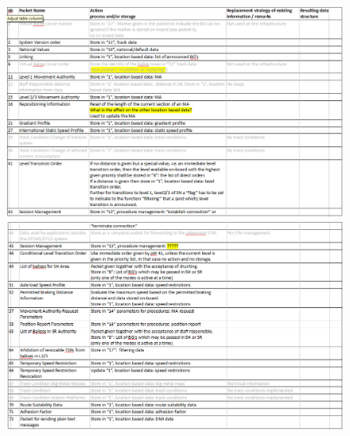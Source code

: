 \documentclass{template/openetcs_report}
\begin{document}
 \begin{figure}[hbtp]
\centering
\includegraphics[scale=0.4]{images/DataFlowUA1}
\centering
\includegraphics[scale=0.4]{images/DataFlowUA2}
\end{figure}
\end{document}
